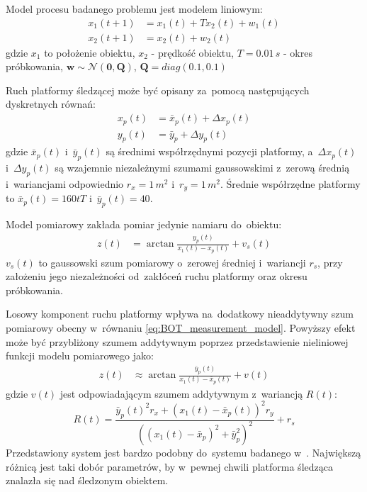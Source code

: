 Model procesu badanego problemu jest modelem liniowym:
\begin{align}\label{eq:BOT_process_model}
x_1(t+1) &= x_1(t) + Tx_2(t) + w_1(t) \nonumber \\
x_2(t+1) &= x_2(t) + w_2(t)
\end{align}
gdzie $x_1$ to położenie obiektu, $x_2$ - prędkość obiektu, $T=0.01\,s$ - okres próbkowania, $\boldsymbol{w} \sim \mathcal{N}(\boldsymbol{0}, \boldsymbol{Q})$, $\boldsymbol{Q}=diag(0.1, 0.1)$ \par
Ruch platformy śledzącej może być opisany za~pomocą następujących dyskretnych równań:
\begin{align}\label{eq:BOT_platform_equations}
x_p(t) &= \bar{x}_p(t) + \Delta x_p(t) \nonumber \\
y_p(t) &= \bar{y}_p + \Delta y_p(t)
\end{align}
gdzie $\bar{x}_p(t)$ i~$\bar{y}_p(t)$ są średnimi współrzędnymi pozycji platformy, a~$\Delta x_p(t)$ i~$\Delta y_p(t)$ są wzajemnie niezależnymi szumami gaussowskimi z~zerową średnią i~wariancjami odpowiednio $r_x=1\,m^2$ i~$r_y=1\,m^2$. Średnie współrzędne platformy to $\bar{x}_p(t)=160tT$ i~$\bar{y}_p(t)=40$. \par
Model pomiarowy zakłada pomiar jedynie namiaru do~obiektu:
\begin{align}\label{eq:BOT_measurement_model}
z(t) &= \arctan \frac{y_p(t)}{x_1(t) - x_p(t)} + v_s(t)
\end{align}
$v_s(t)$ to gaussowski szum pomiarowy o~zerowej średniej i~wariancji $r_s$, przy założeniu jego niezależności od~zakłóceń ruchu platformy oraz okresu próbkowania. \par
Losowy komponent ruchu platformy wpływa na~dodatkowy nieaddytywny szum pomiarowy obecny w~równaniu \ref{eq:BOT_measurement_model}. Powyższy efekt może być przybliżony szumem addytywnym poprzez przedstawienie nieliniowej funkcji modelu pomiarowego jako: 
\begin{align}\label{eq:BOT_measurement_model_approximation}
z(t) &\approx \arctan \frac{\bar{y}_p(t)}{x_1(t) - \bar{x}_p(t)} + v(t) 
\end{align}
gdzie $v(t)$ jest odpowiadającym szumem addytywnym z~wariancją $R(t)$:
\begin{equation}
\label{eq:BOT_R_matrix}
R(t) = \frac{\bar{y}_p(t)^2 r_x + (x_1(t) - \bar{x}_p(t))^2 r_y}{((x_1(t) - \bar{x}_p)^2 + \bar{y}_p^2)^2} + r_s
\end{equation} 
Przedstawiony system jest bardzo podobny do~systemu badanego w~\cite{BOT_Chalasani}. Największą różnicą jest taki dobór parametrów, by w~pewnej chwili platforma śledząca znalazła się nad śledzonym obiektem. 
